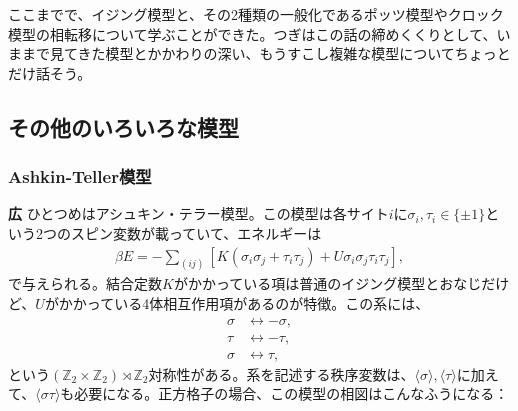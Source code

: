 \documentclass[paper=b5j,fontsize=12Q,jafontsize=12Q,baselineskip=21Q]{jlreq}
\DeclareRobustCommand{\hiron}{\textbf{広 }}
\begin{document}
\begin{refsection}
ここまでで、イジング模型と、その2種類の一般化であるポッツ模型やクロック模型の相転移について学ぶことができた。つぎはこの話の締めくくりとして、いままで見てきた模型とかかわりの深い、もうすこし複雑な模型についてちょっとだけ話そう。

\subsection{その他のいろいろな模型}

\subsubsection{Ashkin-Teller模型}
\hiron ひとつめはアシュキン・テラー模型。この模型は各サイト$i$に$\sigma_i,\tau_i\in\{\pm1\}$という2つのスピン変数が載っていて、エネルギーは
\begin{align}
  \beta E=-\sum_{(ij)}\left[K(\sigma_i\sigma_j+\tau_i\tau_j)+U\sigma_i\sigma_j\tau_i\tau_j\right],
\end{align}
で与えられる。結合定数$K$がかかっている項は普通のイジング模型とおなじだけど、$U$がかかっている4体相互作用項があるのが特徴。この系には、
\begin{align}
  \sigma&\leftrightarrow-\sigma,\\
  \tau&\leftrightarrow-\tau,\\
  \sigma&\leftrightarrow\tau,
\end{align}
という$(\mathbb Z_2\times\mathbb Z_2)\rtimes\mathbb Z_2$対称性がある。系を記述する秩序変数は、$\langle\sigma\rangle,\langle\tau\rangle$に加えて、$\langle\sigma\tau\rangle$も必要になる。正方格子の場合、この模型の相図はこんなふうになる：

\begin{center}
\end{center}
\end{refsection}
\end{document}
